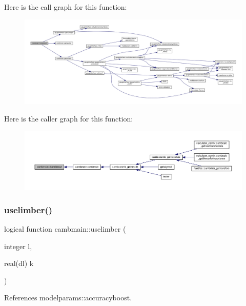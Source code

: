 Here is the call graph for this function\+:
\nopagebreak
\begin{figure}[H]
\begin{center}
\leavevmode
\includegraphics[width=350pt]{namespacecambmain_a3411884ad6ba8d1584e9dedab9fdab81_cgraph}
\end{center}
\end{figure}
Here is the caller graph for this function\+:
\nopagebreak
\begin{figure}[H]
\begin{center}
\leavevmode
\includegraphics[width=350pt]{namespacecambmain_a3411884ad6ba8d1584e9dedab9fdab81_icgraph}
\end{center}
\end{figure}
\mbox{\label{namespacecambmain_ad1efd57b702656e463555cccd0f1b40c}} 
\subsubsection{\texorpdfstring{uselimber()}{uselimber()}}
{\footnotesize\ttfamily logical function cambmain\+::uselimber (\begin{DoxyParamCaption}\item[{integer}]{l,  }\item[{real(dl)}]{k }\end{DoxyParamCaption})\hspace{0.3cm}{\ttfamily [private]}}



References modelparams\+::accuracyboost.



